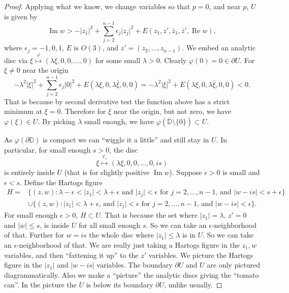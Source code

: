 \documentclass[12pt,openany]{book}
\renewcommand{\Re}{\operatorname{Re}}
\renewcommand{\Im}{\operatorname{Im}}
\newcommand{\sabs}[1]{\lvert {#1} \rvert}
\newcommand{\D}{{\mathbb{D}}}
\theoremstyle{plain}
\theoremstyle{remark}
\theoremstyle{definition}
\theoremstyle{exercise}
\theoremstyle{example}
\begin{document}
\begin{proof}
Applying what we know, we change variables so that $p = 0$, and
near $p$, $U$ is given by
\begin{equation*}
\Im w > -\sabs{z_1}^2 + \sum_{j=2}^{n-1} \epsilon_j \sabs{z_j}^2 +
E(z_1,z',\bar{z}_1,\bar{z}',\Re w) ,
\end{equation*}
where $\epsilon_j = -1,0,1$, $E$ is $O(3)$, and $z' =
(z_2,\ldots,z_{n-1})$.
We embed an analytic disc via
$\xi \overset{\varphi}{\mapsto} (\lambda \xi, 0, 0, \ldots, 0)$ for some small $\lambda > 0$.
%
Clearly $\varphi(0) = 0 \in \partial U$.  For $\xi \not= 0$ near the origin
\begin{equation*}
-\lambda^2 \sabs{\xi}^2 + \sum_{j=2}^{n-1} \epsilon_j \sabs{0}^2 + E(\lambda
\xi,0,\lambda \bar{\xi},0,0)
=
-\lambda^2 \sabs{\xi}^2 + E(\lambda
\xi,0,\lambda \bar{\xi},0,0)
< 0 .
\end{equation*}
That is because by second derivative test the function above has a strict minimum
at $\xi = 0$.  Therefore for $\xi$ near the origin, but not zero, we have 
$\varphi(\xi) \in U$.  By picking $\lambda$ small enough, we have
$\varphi(\overline{\D}\setminus\{0\}) \subset U$.

As $\varphi(\partial \D)$ is compact we can ``wiggle it a little'' and
still stay in $U$.  In particular, for small enough $s > 0$, the disc
\begin{equation*}
\xi \overset{\varphi_s}{\mapsto} (\lambda \xi, 0, 0, \ldots, 0, i s) 
\end{equation*}
is entirely inside $U$ (that is for slightly positive $\Im w$).
Suppose $\epsilon > 0$ is small and $\epsilon < s$.
Define the Hartogs figure
\begin{equation*}
\begin{split}
H =
& \bigl\{ (z,w) : \lambda - \epsilon < \sabs{z_1} < \lambda + \epsilon
\text{ and }
\sabs{z_j} < \epsilon \text{ for $j=2,\ldots,n-1$, and }
\sabs{w-is} < s+\epsilon \bigr\} 
\\
&
\cup 
\bigl\{ (z,w) : \sabs{z_1} < \lambda + \epsilon \text{, and } \sabs{z_j} < \epsilon \text{ for $j=2,\ldots,n-1$, and }
\sabs{w-is} < \epsilon \bigr\} .
\end{split}
\end{equation*}
For small enough $\epsilon >0$, $H \subset U$.
That is because the set where $\sabs{z_1} = \lambda$, $z' = 0$
and $\sabs{w} \leq s$, is inside $U$ for all small enough $s$.  So we can
take an $\epsilon$-neighborhood of that.
Further for
$w = is$ the whole disc where $\sabs{z_1} \leq \lambda$ is in $U$.
So we can take an $\epsilon$-neighborhood of that.
We are really just taking a Hartogs figure in the $z_1,w$ variables, and then
``fattening it up'' to the $z'$ variables.
We picture the Hartogs figure in the $\sabs{z_1}$ and $\sabs{w-is}$
variables.  The boundary $\partial U$ and $U$ are only pictured diagrammatically.
Also we make a ``picture'' the analytic discs giving the ``tomato can''.
In the picture the $U$ is below its boundary $\partial U$, unlike usually.


\end{proof}
\end{document}

